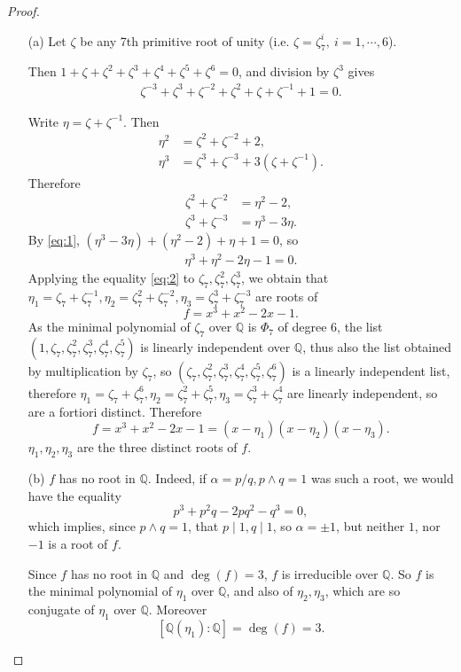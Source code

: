 \documentclass[11pt,a4paper]{article}
\newcommand{\Q}{\mathbb{Q}}
\begin{document}
\begin{proof}
\begin{enumerate}
\item[(a)]
Let $\zeta$ be any 7th primitive root of unity (i.e. $\zeta = \zeta_7^i, \ i=1,\cdots,6$).

Then $1+ \zeta+ \zeta^2 + \zeta^3+\zeta^4+\zeta^5+\zeta^6 = 0$, and  division by $\zeta^3$ gives
\begin{align}
\zeta^{-3} + \zeta^3 + \zeta^{-2}+ \zeta^2+\zeta+\zeta^{-1}+1 = 0. \label{eq:1}
\end{align}

Write $\eta = \zeta+\zeta^{-1}$. Then
\begin{align*}
\eta^2 & = \zeta^2+ \zeta^{-2}+2,\\
\eta^3 &= \zeta^3+\zeta^{-3} + 3(\zeta+\zeta^{-1}).
\end{align*}
Therefore 
\begin{align*} 
\zeta^2+ \zeta^{-2} &= \eta^2-2,\\
 \zeta^3+\zeta^{-3} &= \eta^3 - 3 \eta.
 \end{align*}
By  \eqref{eq:1},
$ (\eta^3 - 3 \eta) +(\eta^2-2) + \eta + 1 = 0$, so
\begin{align}
\eta^3  + \eta^2 - 2 \eta - 1 = 0.\label{eq:2}
\end{align}
Applying the equality \eqref{eq:2} to $\zeta_7, \zeta_7^2, \zeta_7^3$, we obtain that $\eta_1= \zeta_7+\zeta_7^{-1}, \eta_2 = \zeta_7^2 + \zeta_7^{-2}, \eta_3 = \zeta_7^3+\zeta_7^{-3}$ are roots of 
$$f = x^3+x^2-2x-1.$$
As the minimal polynomial of $\zeta_7$ over $ \Q$ is $\Phi_7$ of degree 6, the list $(1,\zeta_7, \zeta_7^2,\zeta_7^3,\zeta_7^4,\zeta_7^5)$ is linearly independent over $\Q$, thus also the list obtained by multiplication by $\zeta_7$, so $(\zeta_7, \zeta_7^2,\zeta_7^3,\zeta_7^4,\zeta_7^5,\zeta_7^6)$ is a linearly independent list, therefore $\eta_1 = \zeta_7+ \zeta_7^6,\eta_2 = \zeta_7^2+\zeta_7^5,\eta_3 = \zeta_7^3+\zeta_7^4$ are linearly independent, so are a fortiori distinct. Therefore
$$f = x^3+x^2-2x-1 = (x- \eta_1)(x-\eta_2)(x-\eta_3).$$
$\eta_1,\eta_2,\eta_3$ are the three distinct roots of $f$.

\item[(b)]
$f$ has no root in $\Q$. Indeed, if $\alpha = p/q, p\wedge q = 1$ was such a root, we would have the equality
$$p^3 + p^2q -2pq^2 -q^3=0,$$
which implies, since $p\wedge q= 1$, that $p \mid 1, q \mid 1$, so $\alpha = \pm1$, but neither $1$, nor $-1$ is a root of $f$.

Since $f$ has no root in $\Q$ and $\deg(f) = 3$, $f$ is irreducible over $\Q$. So $f$ is the minimal polynomial of $\eta_1$ over $\Q$, and also of $\eta_2,\eta_3$, which are so conjugate of $\eta_1$ over $\Q$. Moreover 
$$[\Q(\eta_1):\Q] = \deg(f) = 3.$$


\end{enumerate}
\end{proof}
\end{document}

